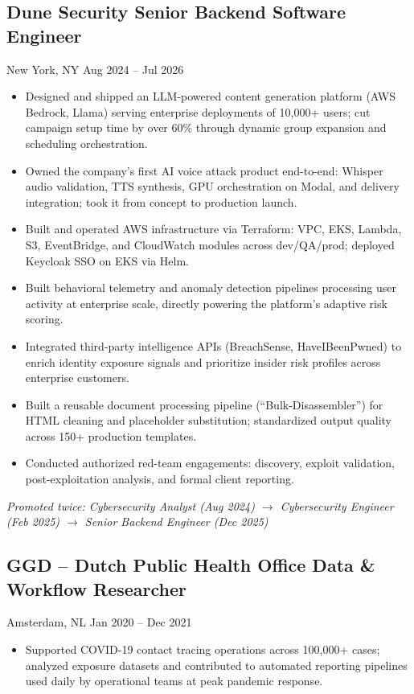 \documentclass[9pt,letterpaper]{article}
\begin{document}
\subsection{Dune Security \hfill Senior Backend Software Engineer}
New York, NY \hfill Aug 2024 -- Jul 2026
\begin{itemize}
\item Designed and shipped an LLM-powered content generation platform (AWS Bedrock, Llama) serving enterprise deployments of 10,000+ users; cut campaign setup time by over 60\% through dynamic group expansion and scheduling orchestration.
\item Owned the company's first AI voice attack product end-to-end: Whisper audio validation, TTS synthesis, GPU orchestration on Modal, and delivery integration; took it from concept to production launch.
\item Built and operated AWS infrastructure via Terraform: VPC, EKS, Lambda, S3, EventBridge, and CloudWatch modules across dev/QA/prod; deployed Keycloak SSO on EKS via Helm.
\item Built behavioral telemetry and anomaly detection pipelines processing user activity at enterprise scale, directly powering the platform's adaptive risk scoring.
\item Integrated third-party intelligence APIs (BreachSense, HaveIBeenPwned) to enrich identity exposure signals and prioritize insider risk profiles across enterprise customers.
\item Built a reusable document processing pipeline (``Bulk-Disassembler'') for HTML cleaning and placeholder substitution; standardized output quality across 150+ production templates.
\item Conducted authorized red-team engagements: discovery, exploit validation, post-exploitation analysis, and formal client reporting.
\end{itemize}
\vspace{1pt}
\hfill \textit{\small Promoted twice: Cybersecurity Analyst (Aug 2024) $\rightarrow$ Cybersecurity Engineer (Feb 2025) $\rightarrow$ Senior Backend Engineer (Dec 2025)}
\subsection{GGD -- Dutch Public Health Office \hfill Data \& Workflow Researcher}
Amsterdam, NL \hfill Jan 2020 -- Dec 2021
\begin{itemize}
\item Supported COVID-19 contact tracing operations across 100,000+ cases; analyzed exposure datasets and contributed to automated reporting pipelines used daily by operational teams at peak pandemic response.
\end{itemize}
\end{document}
